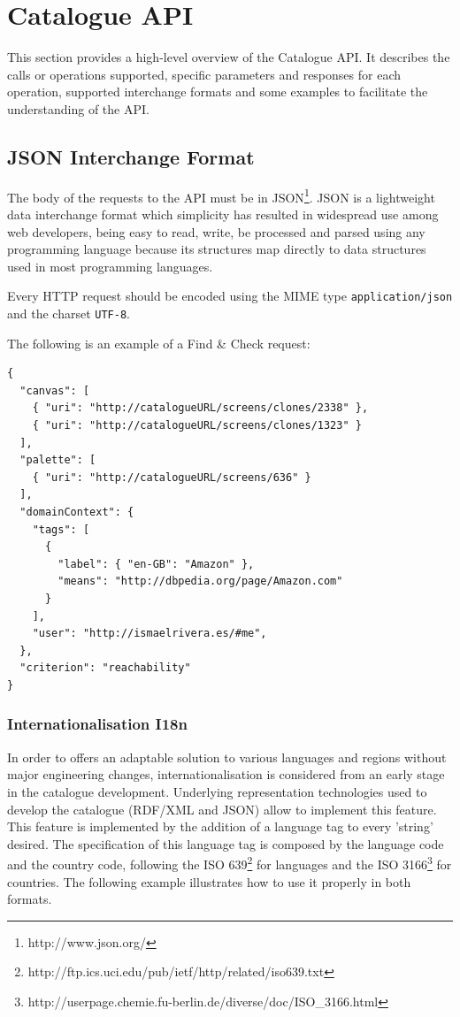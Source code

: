 \documentclass{fast_latex}
\begin{document}


\clearpage
\section{Catalogue API} %
\label{sec:catalogue_api}

This section provides a high-level overview of the Catalogue API. It describes the calls or operations supported, specific parameters and responses for each operation, supported interchange formats and some examples to facilitate the understanding of the API.


\subsection{JSON Interchange Format} %
\label{sec:json_interchange_format}

The body of the requests to the API must be in JSON\footnote{http://www.json.org/}. JSON is a lightweight data interchange format which simplicity has resulted in widespread use among web developers, being easy to read, write, be processed and parsed using any programming language because its structures map directly to data structures used in most programming languages.

Every HTTP request should be encoded using the MIME type \texttt{application/json} and the charset \texttt{UTF-8}.

The following is an example of a Find \& Check request:

\singlespacing
\begin{verbatim}
{
  "canvas": [
    { "uri": "http://catalogueURL/screens/clones/2338" },
    { "uri": "http://catalogueURL/screens/clones/1323" }
  ],
  "palette": [
    { "uri": "http://catalogueURL/screens/636" }
  ],
  "domainContext": {
    "tags": [
      {
        "label": { "en-GB": "Amazon" },
        "means": "http://dbpedia.org/page/Amazon.com"
      }
    ],
    "user": "http://ismaelrivera.es/#me",
  },
  "criterion": "reachability"
}
\end{verbatim}
\doublespacing

\subsubsection{Internationalisation I18n} %

In order to offers an adaptable solution to various languages and regions without major engineering changes, internationalisation is considered from an early stage in the catalogue development. Underlying representation technologies used to develop the catalogue (RDF/XML and JSON) allow to implement this feature. This feature is implemented by the addition of a language tag to every 'string' desired. The specification of this language tag is composed by the language code and the country code, following the ISO 639\footnote{http://ftp.ics.uci.edu/pub/ietf/http/related/iso639.txt} for languages and the ISO 3166\footnote{http://userpage.chemie.fu-berlin.de/diverse/doc/ISO\_3166.html} for countries. The following example illustrates how to use it properly in both formats.
\end{document}
